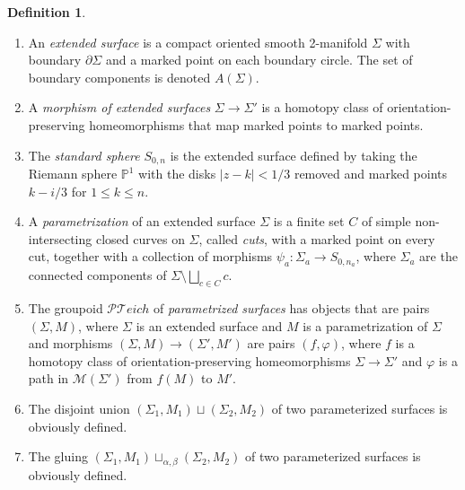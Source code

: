 \documentclass[11pt]{report}
\theoremstyle{definition}
\newtheorem{definition}[theorem]{Definition}
\theoremstyle{remark}
\theoremstyle{remark}
\renewcommand{\P}{\mathbb{P}}
\begin{document}
\begin{definition}
\begin{enumerate}[label=(\roman*)]
\item An \emph{extended surface} is a compact oriented smooth 2-manifold $\Sigma$ with boundary $\partial \Sigma$ and a marked point on each boundary circle. The set of boundary components is denoted $A(\Sigma)$.
\item A \emph{morphism of extended surfaces} $\Sigma \to \Sigma'$ is a homotopy class of orientation-preserving homeomorphisms that map marked points to marked points.
\item The \emph{standard sphere} $S_{0,n}$ is the extended surface defined by taking the Riemann sphere $\P^1$ with the disks $|z-k|<1/3$ removed and marked points $k-i/3$ for $1 \leq k \leq n$.
\item A \emph{parametrization} of an extended surface $\Sigma$ is a finite set $C$ of simple non-intersecting closed curves on $\Sigma$, called \emph{cuts}, with a marked point on every cut, together with a collection of morphisms $\psi_a: \Sigma_a \to S_{0,n_a}$, where $\Sigma_a$ are the connected components of $\Sigma \setminus \bigsqcup_{c \in C} c$.
\item The groupoid $\mathcal{PT}eich$ of \emph{parametrized surfaces} has objects that are pairs $(\Sigma,M)$, where $\Sigma$ is an extended surface and $M$ is a parametrization of $\Sigma$ and morphisms $(\Sigma,M) \to (\Sigma',M')$ are pairs $(f,\varphi)$, where $f$ is a homotopy class of orientation-preserving homeomorphisms $\Sigma \to \Sigma'$ and $\varphi$ is a path in $\mathcal{M}(\Sigma')$ from $f(M)$ to $M'$.
\item The disjoint union $(\Sigma_1,M_1) \sqcup (\Sigma_2,M_2)$ of two parameterized surfaces is obviously defined.
\item The gluing $(\Sigma_1,M_1) \sqcup_{\alpha,\beta} (\Sigma_2,M_2)$ of two parameterized surfaces is obviously defined.
\end{enumerate}
\end{definition}
\end{document}
